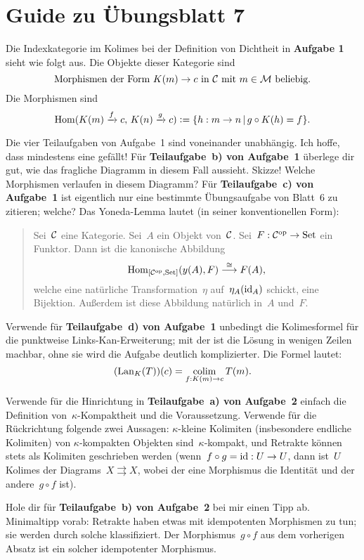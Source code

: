 \documentclass{uebblatt}
\begin{document}
\section*{Guide zu Übungsblatt 7}

Die Indexkategorie im Kolimes bei der Definition von Dichtheit in
\textbf{Aufgabe 1} sieht wie folgt aus. Die Objekte dieser Kategorie sind
\[ \text{Morphismen der Form~$K(m) \to c$ in~$\mathcal{C}$ mit~$m \in \mathcal{M}$ beliebig.} \]
Die Morphismen sind
\[ \mathrm{Hom}(K(m) \xrightarrow{f} c,\, K(n) \xrightarrow{g} c) \vcentcolon=
  \{ h : m \to n \,|\, g \circ K(h) = f \}. \]

Die vier Teilaufgaben von Aufgabe~1 sind voneinander unabhängig. Ich hoffe,
dass mindestens eine gefällt! Für \textbf{Teilaufgabe~b) von Aufgabe~1}
überlege dir gut, wie das fragliche Diagramm in diesem Fall aussieht. Skizze!
Welche Morphismen verlaufen in diesem Diagramm? Für \textbf{Teilaufgabe~c) von
Aufgabe~1} ist eigentlich nur eine bestimmte Übungsaufgabe von Blatt~6 zu
zitieren; welche? Das Yoneda-Lemma lautet (in seiner konventionellen Form):
\begin{quote}
Sei~$\mathcal{C}$ eine Kategorie. Sei~$A$ ein Objekt von~$\mathcal{C}$. Sei~$F : \mathcal{C}^{\mathrm{op}} \to \mathrm{Set}$
ein Funktor. Dann ist die kanonische Abbildung
\[ \mathrm{Hom}_{[\mathcal{C}^{\mathrm{op}},\mathrm{Set}]}(y(A), F) \stackrel{\cong}{\longrightarrow} F(A), \]
welche eine natürliche Transformation~$\eta$ auf~$\eta_A(\mathrm{id}_A)$ schickt, eine
Bijektion. Außerdem ist diese Abbildung natürlich in~$A$ und~$F$.
\end{quote}

Verwende für \textbf{Teilaufgabe~d) von Aufgabe~1} unbedingt die Kolimesformel
für die punktweise Links-Kan-Erweiterung; mit der ist die Lösung in wenigen
Zeilen machbar, ohne sie wird die Aufgabe deutlich komplizierter. Die Formel
lautet:
\[ (\mathrm{Lan}_K(T))(c) = \operatorname*{colim}_{f:K(m) \to c} T(m). \]

Verwende für die Hinrichtung in \textbf{Teilaufgabe~a) von Aufgabe~2} einfach
die Definition von~$\kappa$-Kompaktheit und die Voraussetzung. Verwende für die
Rückrichtung folgende zwei Aussagen: $\kappa$-kleine Kolimiten (insbesondere
endliche Kolimiten) von $\kappa$-kompakten Objekten sind~$\kappa$-kompakt, und
Retrakte können stets als Kolimiten geschrieben werden (wenn~$f \circ g = \mathrm{id} :
U \to U$, dann ist~$U$ Kolimes der Diagrams~$X \rightrightarrows X$, wobei der
eine Morphismus die Identität und der andere~$g \circ f$ ist).

Hole dir für \textbf{Teilaufgabe~b) von Aufgabe~2} bei mir einen Tipp ab.
Minimaltipp vorab: Retrakte haben etwas mit idempotenten Morphismen zu tun;
sie werden durch solche klassifiziert. Der Morphismus~$g \circ f$ aus dem
vorherigen Absatz ist ein solcher idempotenter Morphismus.
\end{document}
